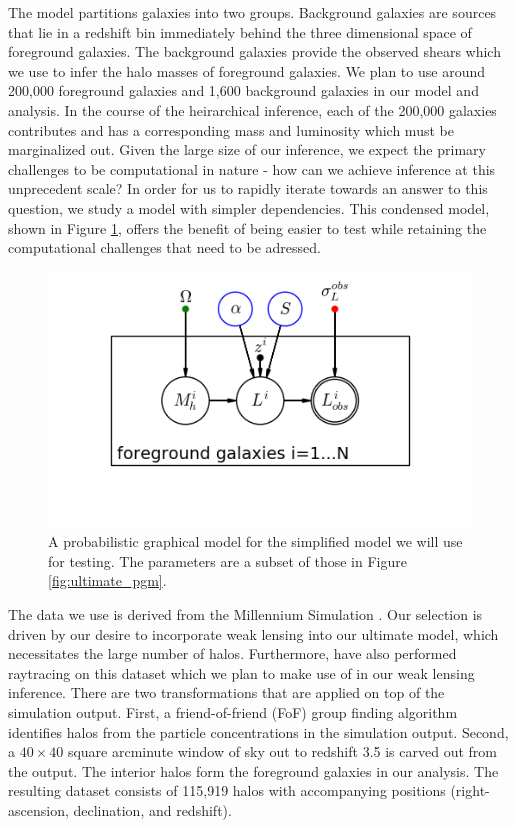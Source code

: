 \documentclass[\docopts]{\docclass}
\begin{document}
The model partitions galaxies into two groups. 
Background galaxies are sources that lie in a redshift bin immediately behind the three dimensional space of foreground galaxies. 
The background galaxies provide the observed shears which we use to infer the halo masses of foreground galaxies. 
We plan to use around 200,000 foreground galaxies and 1,600 background galaxies in our model and analysis. 
In the course of the heirarchical inference, each of the 200,000 galaxies contributes and has a corresponding mass and luminosity which must be marginalized out. 
Given the large size of our inference, we expect the primary challenges to be computational in nature - how can we achieve inference at this unprecedent scale?
In order for us to rapidly iterate towards an answer to this question, we study a model with simpler dependencies.
This condensed model, shown in Figure \ref{fig:simplified_pgm}, offers the benefit of being easier to test while retaining the computational challenges that need to be adressed.

\begin{figure}[h]
\centering
\includegraphics[width=0.9\columnwidth]{simplified_pgm.png}
\caption{
A probabilistic graphical model for the simplified model we will use for testing.
The parameters are a subset of those in Figure \ref{fig:ultimate_pgm}.
\label{fig:simplified_pgm}}
\end{figure}

The data we use is derived from the Millennium Simulation \citep{millennium}. 
Our selection is driven by our desire to incorporate weak lensing into our ultimate model, which necessitates the large number of halos. 
Furthermore, \citet{raytracing} have also performed raytracing on this dataset which we plan to make use of in our weak lensing inference. 
There are two transformations that are applied on top of the simulation output.
First, a friend-of-friend (FoF) group finding algorithm identifies halos from the particle concentrations in the simulation output. Second, a $40 \times 40$ square arcminute window of sky out to redshift 3.5 is carved out from the output. 
The interior halos form the foreground galaxies in our analysis.  
The resulting dataset consists of 115,919 halos with accompanying positions (right-ascension, declination, and redshift).
\end{document}
